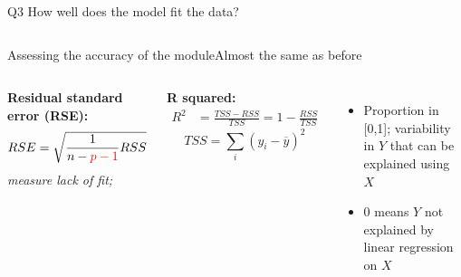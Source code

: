 \documentclass[aspectratio=169,usenames,dvipsnames]{beamer}
\newcommand{\InstructorNotes}[1]{\textit{\color{orange}#1}}
\newcommand{\InstructorList}[1]{
\begin{itemize}
	\color{orange}
	#1
\end{itemize}
}
\begin{document}
\begin{frame}

	\begin{columns}
	\centering
	\begin{block}
		{Q3}
	How well does the model fit the data?
	\end{block}
	
	\end{columns}
	
	\end{frame}
	

\begin{frame}[c]{Assessing the accuracy of the module}{Almost the same as before}
	\centering
\begin{columns}
\textbf{Residual standard error (RSE):}
\begin{align*}
	RSE &= \sqrt{ \frac{1}{n-{\color{red}p-1}} RSS}\\
\end{align*}
\InstructorNotes{measure lack of fit; }




\textbf{R squared:}
\begin{align*}
	R^2 &= \frac{TSS-RSS}{TSS} = 1-\frac{RSS}{TSS}
\end{align*}
\begin{equation*}
	TSS = \sum_i (y_i - \overline y)^2
\end{equation*}
\InstructorList{
\item Proportion in [0,1]; variability in $Y$ that can be explained using $X$
\item 0 means $Y$ not explained by linear regression on $X$}
\end{columns}

\end{frame}

\end{document}
